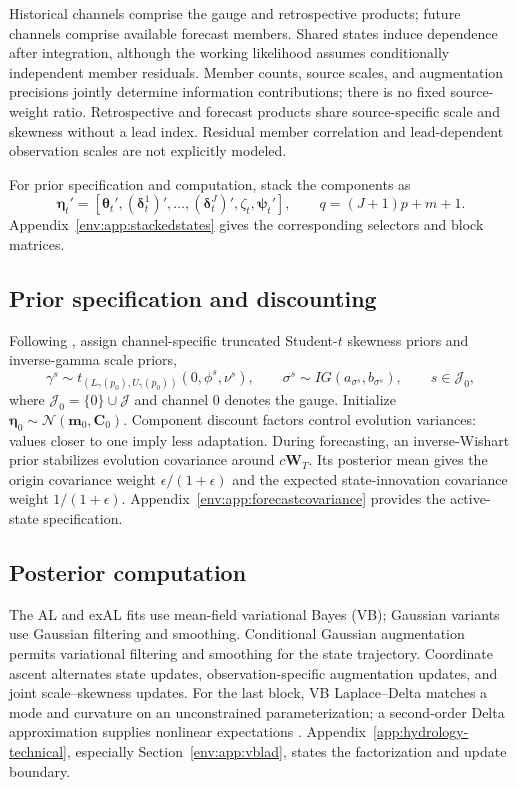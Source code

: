 Historical channels comprise the gauge and retrospective products; future
channels comprise available forecast members. Shared states induce dependence
after integration, although the working likelihood assumes conditionally
independent member residuals. Member counts, source scales, and augmentation
precisions jointly determine information contributions; there is no fixed
source-weight ratio. Retrospective and forecast products share
source-specific scale and skewness without a lead index. Residual member
correlation and lead-dependent observation scales are not explicitly modeled.

For prior specification and computation, stack the components as
\[
\boldsymbol\eta_t'=[\boldsymbol\theta_t',
(\boldsymbol\delta_t^1)',\ldots,(\boldsymbol\delta_t^J)',
\zeta_t,\boldsymbol\psi_t'],\qquad q=(J+1)p+m+1.
\]
Appendix~\ref{env:app:stackedstates} gives the corresponding selectors and
block matrices.

\subsection{Prior specification and discounting}
\label{env:subsec:prioranddisc}

Following \citet{exd-me}, assign channel-specific truncated Student-$t$
skewness priors and inverse-gamma scale priors,
\[
\gamma^s\sim t_{(L_\gamma(p_0),U_\gamma(p_0))}(0,\phi^s,\nu^s),
\qquad
\sigma^s\sim IG(a_{\sigma^s},b_{\sigma^s}),
\qquad s\in\mathcal J_0,
\]
where $\mathcal J_0=\{0\}\cup\mathcal J$ and channel 0 denotes the gauge.
Initialize $\boldsymbol\eta_0\sim\mathcal N(\mathbf m_0,\mathbf C_0)$.
Component discount factors \citep{env-prado2021time} control evolution
variances: values closer to one imply less adaptation. During forecasting, an
inverse-Wishart prior stabilizes evolution covariance around
$c\mathbf W_T$. Its posterior mean gives the origin covariance weight
$\epsilon/(1+\epsilon)$ and the expected state-innovation covariance weight
$1/(1+\epsilon)$. Appendix~\ref{env:app:forecastcovariance} provides the
active-state specification.

\subsection{Posterior computation}
\label{env:subsec:postinf}
\label{environ:sec:body-computation}

The AL and exAL fits use mean-field variational Bayes (VB); Gaussian variants
use Gaussian filtering and smoothing. Conditional Gaussian augmentation
permits variational filtering and smoothing for the state trajectory.
Coordinate ascent alternates state updates, observation-specific
augmentation updates, and joint scale--skewness updates. For the last block,
VB Laplace--Delta matches a mode and curvature on an unconstrained
parameterization; a second-order Delta approximation supplies nonlinear
expectations \citep{exd-wang2013nonconjugatevb}.
Appendix~\ref{app:hydrology-technical}, especially
Section~\ref{env:app:vblad}, states the factorization and update boundary.

